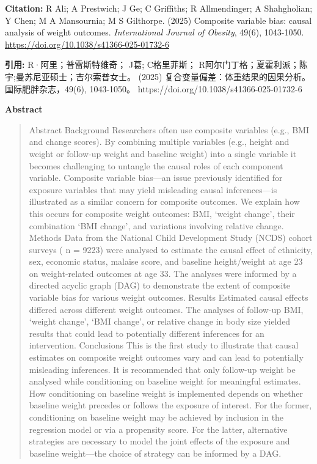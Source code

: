 \noindent\textbf{Citation:} R Ali; A Prestwich; J Ge; C Griffiths; R Allmendinger; A Shahgholian; Y Chen; M A Mansournia; M S Gilthorpe. (2025) Composite variable bias: causal analysis of weight outcomes. \textit{International Journal of Obesity}, 49(6), 1043-1050. \url{https://doi.org/10.1038/s41366-025-01732-6}

\vspace{0.5em}
\noindent\textbf{引用:} R·阿里；普雷斯特维奇； J葛; C格里菲斯； R阿尔门丁格；夏霍利派；陈宇;曼苏尼亚硕士；吉尔索普女士。 (2025) 复合变量偏差：体重结果的因果分析。国际肥胖杂志，49(6), 1043-1050。 https://doi.org/10.1038/s41366-025-01732-6

\vspace{1.5em}
\noindent\textbf{Abstract}\par
\begin{quote}\small
Abstract Background Researchers often use composite variables (e.g., BMI and change scores). By combining multiple variables (e.g., height and weight or follow-up weight and baseline weight) into a single variable it becomes challenging to untangle the causal roles of each component variable. Composite variable bias—an issue previously identified for exposure variables that may yield misleading causal inferences—is illustrated as a similar concern for composite outcomes. We explain how this occurs for composite weight outcomes: BMI, ‘weight change’, their combination ‘BMI change’, and variations involving relative change. Methods Data from the National Child Development Study (NCDS) cohort surveys ( n = 9223) were analysed to estimate the causal effect of ethnicity, sex, economic status, malaise score, and baseline height/weight at age 23 on weight-related outcomes at age 33. The analyses were informed by a directed acyclic graph (DAG) to demonstrate the extent of composite variable bias for various weight outcomes. Results Estimated causal effects differed across different weight outcomes. The analyses of follow-up BMI, ‘weight change’, ‘BMI change’, or relative change in body size yielded results that could lead to potentially different inferences for an intervention. Conclusions This is the first study to illustrate that causal estimates on composite weight outcomes vary and can lead to potentially misleading inferences. It is recommended that only follow-up weight be analysed while conditioning on baseline weight for meaningful estimates. How conditioning on baseline weight is implemented depends on whether baseline weight precedes or follows the exposure of interest. For the former, conditioning on baseline weight may be achieved by inclusion in the regression model or via a propensity score. For the latter, alternative strategies are necessary to model the joint effects of the exposure and baseline weight—the choice of strategy can be informed by a DAG.
\end{quote}

